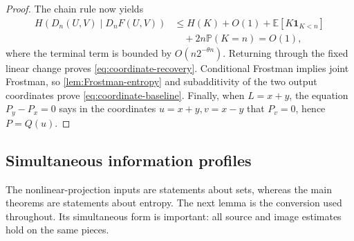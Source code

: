 \documentclass[11pt]{article}
\begin{document}
\begin{proof}
The chain rule now yields
\begin{align*}
 H(D_n(U,V)\mid D_nF(U,V))
 &\le H(K)+O(1)+\mathbb E[K\mathbf1_{K<n}]\\
 &\quad+2n\mathbb P(K=n)=O(1),
\end{align*}
where the terminal term is bounded by
\(O(n2^{-\theta n})\).  Returning through the fixed linear change
proves \eqref{eq:coordinate-recovery}.  Conditional Frostman implies
joint Frostman, so \cref{lem:Frostman-entropy} and subadditivity of
the two output coordinates prove \eqref{eq:coordinate-baseline}.
Finally, when \(L=x+y\), the equation \(P_y-P_x=0\) says in the
coordinates \(u=x+y,v=x-y\) that \(P_v=0\), hence
\(P=Q(u)\).
\end{proof}

\subsection{Simultaneous information profiles}

The nonlinear-projection inputs are statements about sets, whereas
the main theorems are statements about entropy.  The next lemma is
the conversion used throughout.  Its simultaneous form is important:
all source and image estimates hold on the same pieces.
\end{document}
